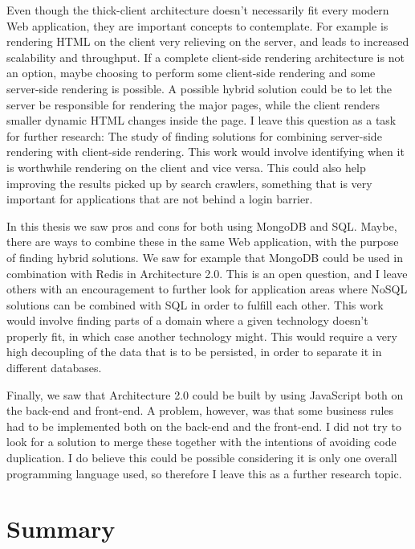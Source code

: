 Even though the thick-client architecture doesn't necessarily fit every modern Web application, they are important concepts to contemplate. For example is rendering HTML on the client very relieving on the server, and leads to increased scalability and throughput. If a complete client-side rendering architecture is not an option, maybe choosing to perform some client-side rendering and some server-side rendering is possible. A possible hybrid solution could be to let the server be responsible for rendering the major pages, while the client renders smaller dynamic HTML changes inside the page.  I leave this question as a task for further research: The study of finding solutions for combining server-side rendering with client-side rendering. This work would involve identifying when it is worthwhile rendering on the client and vice versa. This could also help improving the results picked up by search crawlers, something that is very important for applications that are not behind a login barrier. 

In this thesis we saw pros and cons for both using MongoDB and SQL. Maybe, there are ways to combine these in the same Web application, with the purpose of finding hybrid solutions. We saw for example that MongoDB could be used in combination with Redis in Architecture 2.0. This is an open question, and I leave others with an encouragement to further look for application areas where NoSQL solutions can be combined with SQL in order to fulfill each other. This work would involve finding parts of a domain where a given technology doesn't properly fit, in which case another technology might. This would require a very high decoupling of the data that is to be persisted, in order to separate it in different databases. 

Finally, we saw that Architecture 2.0 could be built by using JavaScript both on the back-end and front-end. A problem, however, was that some business rules had to be implemented both on the back-end and the front-end. I did not try to look for a solution to merge these together with the intentions of avoiding code duplication. I do believe this could be possible considering it is only one overall programming language used, so therefore I leave this as a further research topic. 


\section{Summary}
